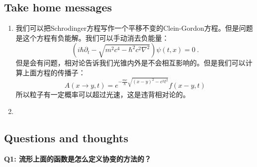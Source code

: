 \subsection{Take home messages}

\begin{enumerate}
  \item 我们可以把Schrodinger方程写作一个平移不变的Clein-Gordon方程。但是问题是这个方程有负能解。我们可以手动消去负能量：
    \begin{equation}
      (i\hbar\partial_t-\sqrt{m^2c^4-\hbar^2c^2\nabla^2})\psi(t,x)=0\mathrm{~.}
      \label{eq:nonegativenergyspectrum}
    \end{equation}
    但是会有问题，相对论告诉我们光锥内外是不会相互影响的。但是我们可以计算上面方程的传播子：
    \begin{equation}
      A(x\to y,t)=e^{-\frac{mc}{\hbar}\sqrt{(x-y)^2-c^2t^2}}f(x-y,t)
      \label{eq:propergagtiontest}
    \end{equation}
    所以粒子有一定概率可以超过光速，这是违背相对论的。
  \item 
\end{enumerate}

\subsection{Questions and thoughts}
\textbf{Q1: 流形上面的函数是怎么定义协变的方法的？}




